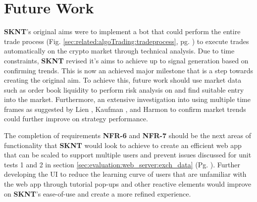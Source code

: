 \section{Future Work}
\label{sec:conclusion:future}

\noindent \textbf{SKNT}'s original aims were to implement a bot that could perform the entire trade process (Fig. \ref{sec:related:algoTrading:tradeprocess}, pg. \pageref{sec:related:algoTrading:tradeprocess}) to execute trades automatically on the crypto market through technical analysis. Due to time constraints, \textbf{SKNT} revised it's aims to achieve up to signal generation based on confirming trends. This is now an achieved major milestone that is a step towards creating the original aim. To achieve this, future work should use market data such as order book liquidity to perform risk analysis on and find suitable entry into the market. Furthermore, an extensive investigation into using multiple time frames as suggested by Lien \cite{BOOK:Lien:2016}, Kaufman \cite{BOOK:Kaufman:2013}, and Harmon \cite{BOOK:Harmon:2014} to confirm market trends could further improve on strategy performance. 

The completion of requirements \textbf{NFR-6} and \textbf{NFR-7} should be the next areas of functionality that \textbf{SKNT} would look to achieve to create an efficient web app that can be scaled to support multiple users and prevent issues discussed for unit tests 1 and 2 in section \ref{sec:evaluation:web_server:exch_data} (Pg. \pageref{sec:evaluation:web_server:exch_data}). Further developing the UI to reduce the learning curve of users that are unfamiliar with the web app through tutorial pop-ups and other reactive elements would improve on \textbf{SKNT}'s ease-of-use and create a more refined experience. 


